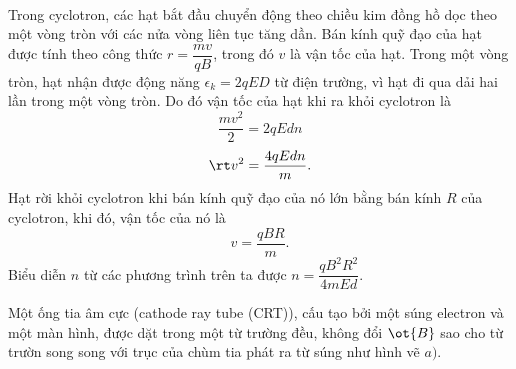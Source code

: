 \begin{loigiai}\\
Trong cyclotron, các hạt bắt đầu chuyển động theo chiều kim đồng hồ dọc theo một vòng tròn với các nửa vòng liên tục tăng dần. Bán kính quỹ đạo của hạt được tính theo công thức $r=\dfrac{mv}{qB}$,
trong đó $v$ là vận tốc của hạt. Trong một vòng tròn, hạt nhận được động năng $\epsilon_k=2qED$ từ điện trường, vì hạt đi qua dải hai lần trong một vòng tròn. Do đó vận tốc của hạt khi ra khỏi cyclotron là
$$\dfrac{mv^2}{2}=2qEdn$$
$$\rt v^2=\dfrac{4qEdn}{m}.$$
Hạt rời khỏi cyclotron khi bán kính quỹ đạo của nó lớn bằng bán kính $R$ của cyclotron, khi đó, vận tốc của nó là $$v=\dfrac{qBR}{m}.$$
Biểu diễn $n$ từ các phương trình trên ta được $n =\dfrac{ qB^2R^2}{4mEd}$.
\end{loigiai}

\begin{vd}%
Một ống tia âm cực (cathode ray tube (CRT)), cấu tạo bởi một súng electron và một màn hình, được dặt trong một từ trường đều, không đổi $\ot{B}$ sao cho từ trườn song song với trục của chùm tia phát ra từ súng như hình vẽ $a)$.
\begin{center}
 


\begin{tikzpicture}[x=0.75pt,y=0.75pt,yscale=-1,xscale=1]


\end{tikzpicture}
\end{center}
\end{vd}
